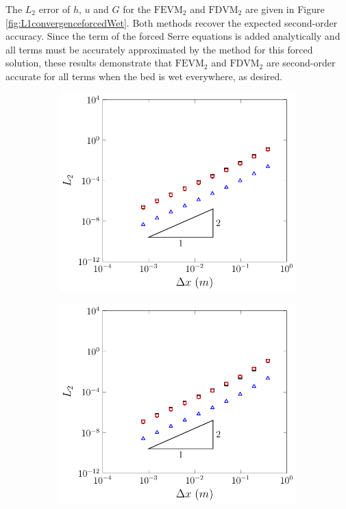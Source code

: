The $L_2$ error of $h$, $u$ and $G$ for the $\text{FEVM}_2$ and $\text{FDVM}_2$ are given in Figure \ref{fig:L1convergenceforcedWet}. Both methods recover the expected second-order accuracy. Since the term of the forced Serre equations is added analytically and all terms must be accurately approximated by the method for this forced solution, these results demonstrate that $\text{FEVM}_2$ and $\text{FDVM}_2$ are second-order accurate for all terms when the bed is wet everywhere, as desired.

\begin{figure}
	\centering
	\begin{subfigure}{0.5\textwidth}
		\includegraphics[width=\textwidth]{./chp5/figures/Forced/Wet/FEVML2.pdf}
	\end{subfigure}%
	\begin{subfigure}{0.5\textwidth}
		\includegraphics[width=\textwidth]{./chp5/figures/Forced/Wet/FDVML2.pdf}

\end{subfigure}
\end{figure}
